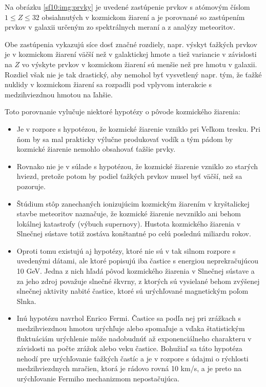 \documentclass[../../main.tex]{subfiles}
\begin{document}
Na obrázku \ref{sf10:img:prvky} je uvedené zastúpenie prvkov s atómovým číslom $1\leq Z\leq 32$ obsiahnutých v kozmickom žiarení a je porovnané so zastúpením prvkov v galaxii určeným zo spektrálnych meraní a z analýzy meteoritov.

Obe zastúpenia vykazujú síce dosť značné rozdiely, napr. výskyt ťažkých prvkov je v kozmickom žiarení väčší než v galaktickej hmote a tiež variancie v závislosti na $Z$ vo výskyte prvkov v kozmickom žiarení sú menšie než pre hmotu v galaxii. Rozdiel však nie je tak drastický, aby nemohol byť vysvetlený napr. tým, že ťažké nuklidy v kozmickom žiarení sa rozpadli pod vplyvom interakcie s medzihviezdnou hmotou na ľahšie.

Toto porovnanie vylučuje niektoré hypotézy o pôvode kozmického žiarenia:
\begin{itemize}
\item Je v rozpore s hypotézou, že kozmické žiarenie vzniklo pri Veľkom tresku. Pri ňom by sa mal prakticky výlučne produkovať vodík a tým pádom by kozmické žiarenie nemohlo obsahovať ťažšie prvky.

\item Rovnako nie je v súlade s hypotézou, že kozmické žiarenie vzniklo zo starých hviezd, pretože potom by podiel ťažkých prvkov musel byť väčší, než sa pozoruje.

\item Štúdium stôp zanechaných ionizujúcim kozmickým žiarením v kryštalickej stavbe meteoritov naznačuje, že kozmické žiarenie nevzniklo ani behom lokálnej katastrofy (výbuch supernovy). Hustota kozmického žiarenia v Slnečnej sústave totiž zostáva konštantné po celú poslednú miliardu rokov.

\item Oproti tomu existujú aj hypotézy, ktoré nie sú v tak silnom rozpore s uvedenými dátami, ale ktoré popisujú iba častice s energiou neprekračujúcou 10 GeV. Jedna z nich hľadá pôvod kozmického žiarenia v Slnečnej sústave a za jeho zdroj považuje slnečné škvrny, z ktorých sú vysielané behom zvýšenej slnečnej aktivity nabité častice, ktoré sú urýchľované magnetickým poľom Slnka.

\item Inú hypotézu navrhol Enrico Fermi. Častice sa podľa nej pri zrážkach s medzihviezdnou hmotou urýchľuje alebo spomaľuje a vďaka štatistickým fluktuáciám urýchlenie môže nadobudnúť až exponenciálneho charakteru v závislosti na počte zrážok alebo veku častice. Bohužiaľ sa táto hypotéza nehodí pre urýchľovanie ťažkých častíc a je v rozpore s údajmi o rýchlosti medzihviezdnych mračien, ktorá je rádovo rovná 10 km/s, a je preto na urýchľovanie Fermiho mechanizmom nepostačujúca.
\end{itemize}
\end{document}
